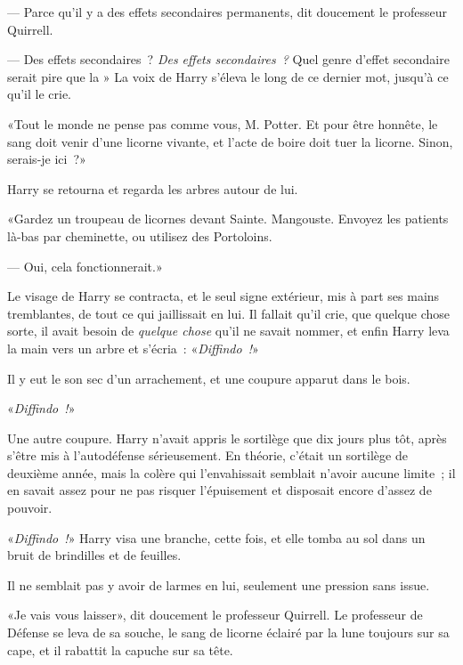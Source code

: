 --- Parce qu'il y a des effets secondaires permanents, dit doucement le professeur Quirrell.

--- Des effets secondaires~? \emph{Des effets secondaires~?} Quel genre d'effet secondaire serait pire que la » La voix de Harry s'éleva le long de ce dernier mot, jusqu'à ce qu'il le crie.

«Tout le monde ne pense pas comme vous, M. Potter. Et pour être honnête, le sang doit venir d'une licorne vivante, et l'acte de boire doit tuer la licorne. Sinon, serais-je ici~?»

Harry se retourna et regarda les arbres autour de lui.

«Gardez un troupeau de licornes devant Sainte. Mangouste. Envoyez les patients là-bas par cheminette, ou utilisez des Portoloins.

--- Oui, cela fonctionnerait.»

Le visage de Harry se contracta, et le seul signe extérieur, mis à part ses mains tremblantes, de tout ce qui jaillissait en lui. Il fallait qu'il crie, que quelque chose sorte, il avait besoin de \emph{quelque chose} qu'il ne savait nommer, et enfin Harry leva la main vers un arbre et s'écria~: «\emph{Diffindo~!}»

Il y eut le son sec d'un arrachement, et une coupure apparut dans le bois.

«\emph{Diffindo~!}»

Une autre coupure. Harry n'avait appris le sortilège que dix jours plus tôt, après s'être mis à l'autodéfense sérieusement. En théorie, c'était un sortilège de deuxième année, mais la colère qui l'envahissait semblait n'avoir aucune limite~; il en savait assez pour ne pas risquer l'épuisement et disposait encore d'assez de pouvoir.

«\emph{Diffindo~!}» Harry visa une branche, cette fois, et elle tomba au sol dans un bruit de brindilles et de feuilles.

Il ne semblait pas y avoir de larmes en lui, seulement une pression sans issue.

«Je vais vous laisser», dit doucement le professeur Quirrell. Le professeur de Défense se leva de sa souche, le sang de licorne éclairé par la lune toujours sur sa cape, et il rabattit la capuche sur sa tête.

